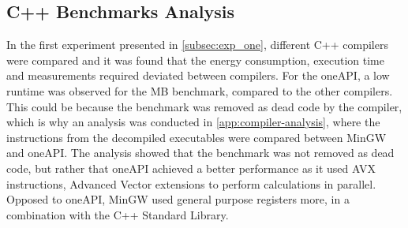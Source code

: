 \subsection{C++ Benchmarks Analysis}

In the first experiment presented in \cref{subsec:exp_one}, different C++ compilers were compared and it was found that the energy consumption, execution time and measurements required deviated between compilers. For the oneAPI, a low runtime was observed for the MB benchmark, compared to the other compilers. This could be because the benchmark was removed as dead code by the compiler, which is why an analysis was conducted in \cref{app:compiler-analysis}, where the instructions from the decompiled executables were compared between MinGW and oneAPI. The analysis showed that the benchmark was not removed as dead code, but rather that oneAPI achieved a better performance as it used AVX instructions, Advanced Vector extensions to perform calculations in parallel. Opposed to oneAPI, MinGW used general purpose registers more, in a combination with the C++ Standard Library.  







